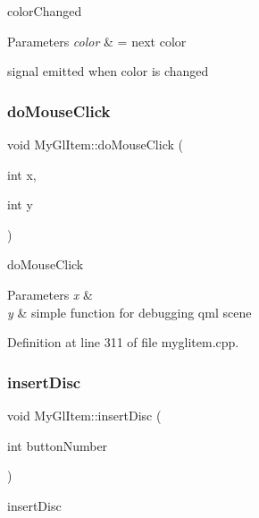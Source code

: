 color\+Changed 


\begin{DoxyParams}{Parameters}
{\em color} & = next color\\
\hline
\end{DoxyParams}
signal emitted when color is changed \mbox{\label{class_my_gl_item_a76e20888c579fb444dc071a43a301ced}} 
\subsubsection{\texorpdfstring{doMouseClick}{doMouseClick}}
{\footnotesize\ttfamily void My\+Gl\+Item\+::do\+Mouse\+Click (\begin{DoxyParamCaption}\item[{int}]{x,  }\item[{int}]{y }\end{DoxyParamCaption})\hspace{0.3cm}{\ttfamily [slot]}}



do\+Mouse\+Click 


\begin{DoxyParams}{Parameters}
{\em x} & \\
\hline
{\em y} & simple function for debugging qml scene \\
\hline
\end{DoxyParams}


Definition at line 311 of file myglitem.\+cpp.

\mbox{\label{class_my_gl_item_aede114472dca4859706ee76de910e7bf}} 
\subsubsection{\texorpdfstring{insertDisc}{insertDisc}}
{\footnotesize\ttfamily void My\+Gl\+Item\+::insert\+Disc (\begin{DoxyParamCaption}\item[{int}]{button\+Number }\end{DoxyParamCaption})\hspace{0.3cm}{\ttfamily [slot]}}



insert\+Disc 


